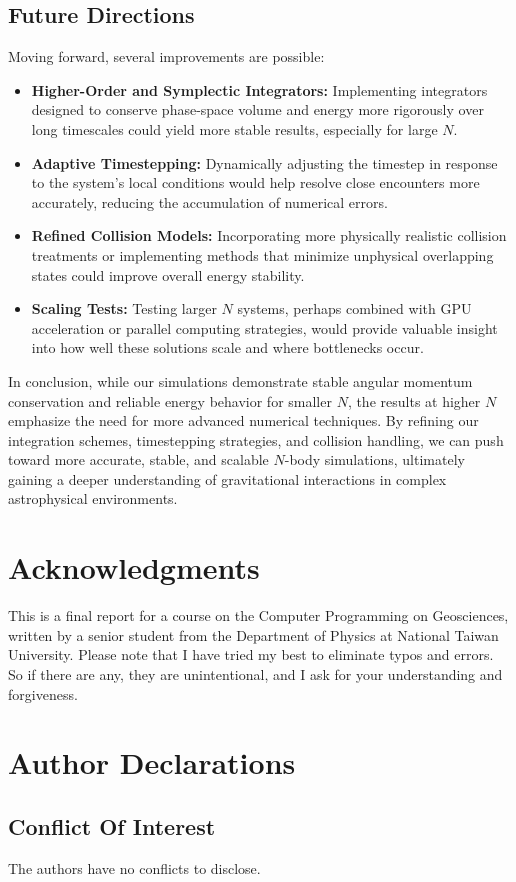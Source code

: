 \documentclass[a4paper, 12pt, oneside, onecolumn]{article}
\begin{document}
\begin{multicols}{2}
\subsection*{Future Directions}

Moving forward, several improvements are possible:

\begin{itemize}
    \item \textbf{Higher-Order and Symplectic Integrators:} Implementing integrators designed to conserve phase-space volume and energy more rigorously over long timescales could yield more stable results, especially for large $N$.
    \item \textbf{Adaptive Timestepping:} Dynamically adjusting the timestep in response to the system’s local conditions would help resolve close encounters more accurately, reducing the accumulation of numerical errors.
    \item \textbf{Refined Collision Models:} Incorporating more physically realistic collision treatments or implementing methods that minimize unphysical overlapping states could improve overall energy stability.
    \item \textbf{Scaling Tests:} Testing larger $N$ systems, perhaps combined with GPU acceleration or parallel computing strategies, would provide valuable insight into how well these solutions scale and where bottlenecks occur.
\end{itemize}

In conclusion, while our simulations demonstrate stable angular momentum conservation and reliable energy behavior for smaller $N$, the results at higher $N$ emphasize the need for more advanced numerical techniques. By refining our integration schemes, timestepping strategies, and collision handling, we can push toward more accurate, stable, and scalable $N$-body simulations, ultimately gaining a deeper understanding of gravitational interactions in complex astrophysical environments.








\end{multicols}


\section*{Acknowledgments}
This is a final report for a course on the Computer Programming on Geosciences, written by a senior student from the Department of Physics at National Taiwan University. Please note that I have tried my best to eliminate typos and errors. So if there are any, they are unintentional, and I ask for your understanding and forgiveness.
\section*{Author Declarations}
\subsection*{Conflict Of Interest}
The authors have no conflicts to disclose.
\newpage
\nocite{*}


\end{document}
